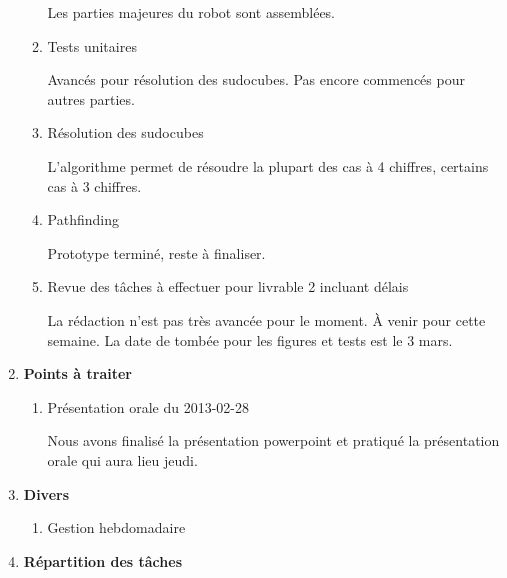 \documentclass[12pt]{ULojpv}
\begin{document}
\begin{enumerate}
\begin{enumerate}
Les parties majeures du robot sont assemblées. 

\item Tests unitaires

Avancés pour résolution des sudocubes. Pas encore commencés pour autres parties.

\item Résolution des sudocubes

L'algorithme permet de résoudre la plupart des cas à 4 chiffres, certains cas à 3 chiffres.

\item Pathfinding

Prototype terminé, reste à finaliser.


\item Revue des tâches à effectuer pour livrable 2 incluant délais

La rédaction n'est pas très avancée pour le moment. À venir pour cette semaine. La date de tombée pour les figures et tests est le 3 mars.

\end{enumerate}


\item \textbf{Points à traiter}

\begin{enumerate}

\item Présentation orale du 2013-02-28

Nous avons finalisé la présentation powerpoint et pratiqué la présentation orale qui aura lieu jeudi.

\end{enumerate}


\item \textbf{Divers}

\begin{enumerate}

\item Gestion hebdomadaire



\end{enumerate}

\item \textbf{Répartition des tâches}


\end{enumerate}
\end{document}
